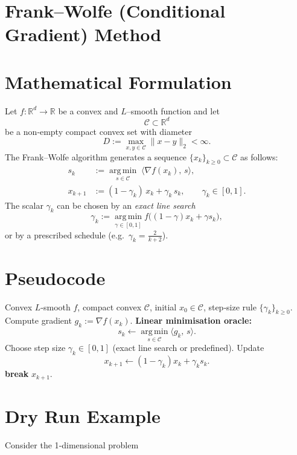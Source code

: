 \documentclass{article}
\newcommand{\argmin}{\operatorname*{arg\,min}}
\begin{document}
\section*{Frank–Wolfe (Conditional Gradient) Method}

\section*{Mathematical Formulation}
Let $f:\mathbb{R}^d\to\mathbb{R}$ be a convex and $L$–smooth function and let 
\[
\mathcal C\subset\mathbb{R}^d
\]
be a non‑empty compact convex set with diameter 
\[
D:=\max_{x,y\in\mathcal C}\|x-y\|_2<\infty .
\]
The Frank–Wolfe algorithm generates a sequence $\{x_k\}_{k\ge 0}\subset\mathcal C$ as follows:
\begin{align}
s_k &:= \argmin_{s\in\mathcal C}\;\langle \nabla f(x_k),\,s\rangle , \tag{FW‑1}\\[4pt]
x_{k+1} &:= (1-\gamma_k)\,x_k + \gamma_k\,s_k , \qquad \gamma_k\in[0,1]. \tag{FW‑2}
\end{align}
The scalar $\gamma_k$ can be chosen by an \emph{exact line search}
\[
\gamma_k:=\argmin_{\gamma\in[0,1]} f\bigl((1-\gamma)x_k+\gamma s_k\bigr),
\]
or by a prescribed schedule (e.g.\ $\gamma_k=\frac{2}{k+2}$).

\section*{Pseudocode}
\begin{algorithm}[H]
\caption{Frank–Wolfe Method}\label{alg:FW}
\begin{algorithmic}[1]
\Require Convex $L$‑smooth $f$, compact convex $\mathcal C$, initial $x_0\in\mathcal C$, step‑size rule $\{\gamma_k\}_{k\ge0}$.
    \State Compute gradient $g_k := \nabla f(x_k)$.
    \State \textbf{Linear minimisation oracle:}
    \[
        s_k \gets \argmin_{s\in\mathcal C}\langle g_k,\,s\rangle .
    \] 
    \State Choose step size $\gamma_k\in[0,1]$ (exact line search or predefined).
    \State Update 
    \[
        x_{k+1} \gets (1-\gamma_k)x_k + \gamma_k s_k .
    \]
        \State \textbf{break}
    \EndIf
\EndFor
\State \Return $x_{k+1}$.
\end{algorithmic}
\end{algorithm}

\section*{Dry Run Example}
Consider the 1‑dimensional problem  
\end{document}
